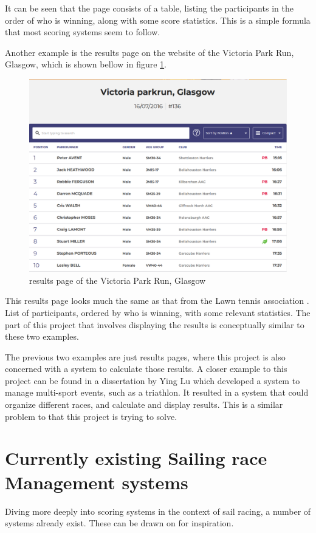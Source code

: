 \documentclass{l4proj}
\begin{document}
It can be seen that the page consists of a table, listing the participants in the order of who is winning, along with some score statistics. This is a simple formula that most scoring systems seem to follow.

Another example is the results page on the website of the Victoria Park Run, Glasgow, which is shown bellow in figure \ref{fig:parkrun}.

\begin{figure}[h!]
    \centering
    \includegraphics[width=0.6\linewidth]{images/ParkRun.png} 

    \caption{results page of the Victoria Park Run, Glasgow \citep{Parkrun}
    }

    \label{fig:parkrun} 
\end{figure}

This results page looks much the same as that from the Lawn tennis association \citet{Tennis}. List of participants, ordered by who is winning, with some relevant statistics. The part of this project that involves displaying the results is conceptually similar to these two examples.

The previous two examples are just results pages, where this project is also concerned with a system to calculate those results. A closer example to this project can be found in a dissertation by Ying Lu \citet{Multi-sport} which developed a system to manage multi-sport events, such as a triathlon. It resulted in a system that could organize different races, and calculate and display results. This is a similar problem to that this project is trying to solve.

\section{Currently existing Sailing race Management systems}
Diving more deeply into scoring systems in the context of sail racing, a number of systems already exist. These can be drawn on for inspiration.
\end{document}
